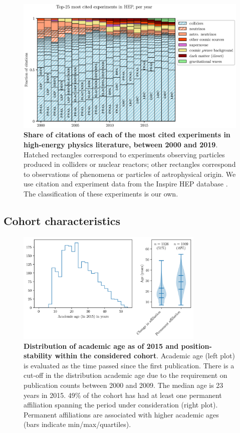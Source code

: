 \documentclass{article}
\begin{document}
\begin{figure}[H]
    \centering
    \includegraphics[width=\textwidth]{plots/experiments.eps}
    \caption{\textbf{Share of citations of each of the most cited experiments in high-energy physics literature, between 2000 and 2019}. Hatched rectangles correspond to experiments observing particles produced in colliders or nuclear reactors; other rectangles correspond to observations of phenomena or particles of astrophysical origin. We use citation and experiment data from the Inspire HEP database \citep{InspireAPI}. The classification of these experiments is our own. }
    \label{fig:experiments}
\end{figure}


\subsection{\label{appendix:sample_characteristics}Cohort characteristics}

\begin{figure}[H]
    \centering
    \includegraphics[width=0.8\textwidth]{plots/sample_characteristics.png}
    \caption{\textbf{Distribution of academic age as of 2015 and position-stability within the considered cohort}.  Academic age (left plot) is evaluated as the time passed since the first publication. There is a cut-off in the distribution academic age due to the requirement on publication counts between 2000 and 2009. The median age is 23 years in 2015. 49\% of the cohort has had at least one permanent affiliation spanning the period under consideration (right plot). Permanent affiliations are associated with higher academic ages (bars indicate min/max/quartiles). }
    \label{fig:sample_characteristics}
\end{figure}
\end{document}
